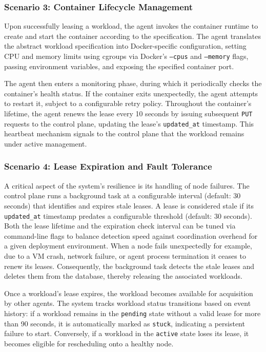 \subsubsection{Scenario 3: Container Lifecycle Management}

Upon successfully leasing a workload, the agent invokes the container runtime to create and start the container according to the specification. The agent translates the abstract workload specification into Docker-specific configuration, setting CPU and memory limits using cgroups via Docker's \texttt{--cpus} and \texttt{--memory} flags, passing environment variables, and exposing the specified container port.

The agent then enters a monitoring phase, during which it periodically checks the container's health status. If the container exits unexpectedly, the agent attempts to restart it, subject to a configurable retry policy. Throughout the container's lifetime, the agent renews the lease every 10 seconds by issuing subsequent \texttt{PUT} requests to the control plane, updating the lease's \texttt{updated\_at} timestamp. This heartbeat mechanism signals to the control plane that the workload remains under active management.

\subsubsection{Scenario 4: Lease Expiration and Fault Tolerance}

A critical aspect of the system's resilience is its handling of node failures. The control plane runs a background task at a configurable interval (default: 30 seconds) that identifies and expires stale leases. A lease is considered stale if its \texttt{updated\_at} timestamp predates a configurable threshold (default: 30 seconds). Both the lease lifetime and the expiration check interval can be tuned via command-line flags to balance detection speed against coordination overhead for a given deployment environment. When a node fails unexpectedly for example, due to a VM crash, network failure, or agent process termination it ceases to renew its leases. Consequently, the background task detects the stale leases and deletes them from the database, thereby releasing the associated workloads.

Once a workload's lease expires, the workload becomes available for acquisition by other agents. The system tracks workload status transitions based on event history: if a workload remains in the \texttt{pending} state without a valid lease for more than 90 seconds, it is automatically marked as \texttt{stuck}, indicating a persistent failure to start. Conversely, if a workload in the \texttt{active} state loses its lease, it becomes eligible for rescheduling onto a healthy node.

